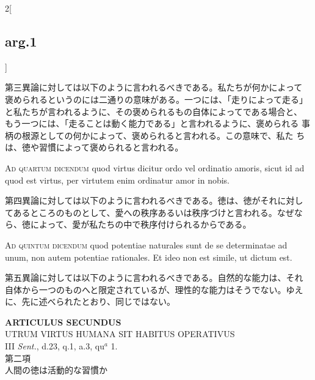 \documentclass[paper=a4paper,fontsize=10pt,jafontsize=9pt,titlepage]{jlreq}
\begin{document}
\begin{paracol}{2}[\subsection{arg.1}]
\switchcolumn

第三異論に対しては以下のように言われるべきである。私たちが何かによって
褒められるというのには二通りの意味がある。一つには、「走りによって走る」
と私たちが言われるように、その褒められるもの自体によってである場合と、
もう一つには、「走ることは動く能力である」と言われるように、褒められる
事柄の根源としての何かによって、褒められると言われる。この意味で、私た
ちは、徳や習慣によって褒められると言われる。

\switchcolumn*[\subsection{ad.4}]

{\scshape Ad quartum dicendum} quod virtus dicitur ordo vel ordinatio
amoris, sicut id ad quod est virtus, per virtutem enim ordinatur amor
in nobis.

\switchcolumn

第四異論に対しては以下のように言われるべきである。徳は、徳がそれに対し
てあるところのものとして、愛への秩序あるいは秩序づけと言われる。なぜな
ら、徳によって、愛が私たちの中で秩序付けられるからである。

\switchcolumn*[\subsection{ad.5}]

{\scshape Ad quintum dicendum} quod potentiae naturales sunt de se
determinatae ad unum, non autem potentiae rationales. Et ideo non est
simile, ut dictum est.

\switchcolumn

第五異論に対しては以下のように言われるべきである。自然的な能力は、それ
自体から一つのものへと限定されているが、理性的な能力はそうでない。ゆえ
に、先に述べられたとおり、同じではない。

\end{paracol}
\newpage
{}
{}
\setcounter{section}{2}
\setcounter{subsection}{0}


\begin{center}
{\Large {\bfseries ARTICULUS SECUNDUS}}\\
{\large UTRUM VIRTUS HUMANA SIT HABITUS OPERATIVUS}\\
{\footnotesize III {\itshape Sent.}, d.23, q.1, a.3, qu$^{a}$ 1.}\\
{\Large 第二項\\人間の徳は活動的な習慣か}
\end{center}
\end{document}
